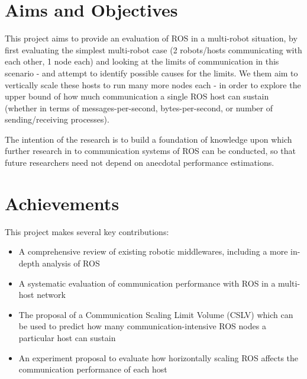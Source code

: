 \documentclass[../dissertation.tex]{subfiles}
\begin{document}
\section{Aims and Objectives}

This project aims to provide an evaluation of ROS in a multi-robot situation, by first evaluating the simplest multi-robot case (2 robots/hosts communicating with each other, 1 node each) and looking at the limits of communication in this scenario - and attempt to identify possible causes for the limits. We them aim to vertically scale these hosts to run many more nodes each - in order to explore the upper bound of how much communication a single ROS host can sustain (whether in terms of messages-per-second, bytes-per-second, or number of sending/receiving processes).

The intention of the research is to build a foundation of knowledge upon which further research in to communication systems of ROS can be conducted, so that future researchers need not depend on anecdotal performance estimations.

\section{Achievements}

This project makes several key contributions:

\begin{itemize}
  \item A comprehensive review of existing robotic middlewares, including a more in-depth analysis of ROS
  \item A systematic evaluation of communication performance with ROS in a multi-host network
  \item The proposal of a Communication Scaling Limit Volume (CSLV) which can be used to predict how many communication-intensive ROS nodes a particular host can sustain
  \item An experiment proposal to evaluate how horizontally scaling ROS affects the communication performance of each host
\end{itemize}
\end{document}
